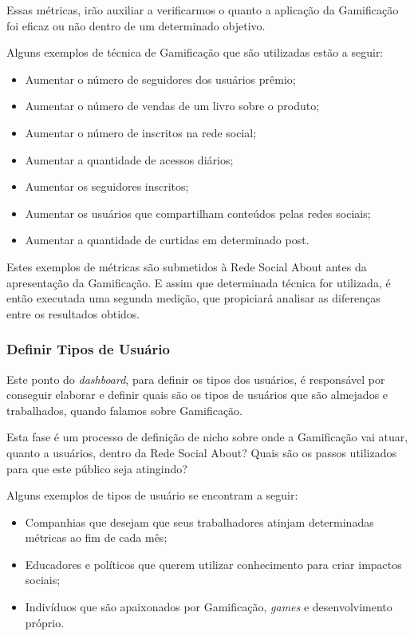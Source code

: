 Essas métricas, irão auxiliar a verificarmos o quanto a aplicação da Gamificação
 foi eficaz ou
não dentro de um determinado objetivo.

Alguns exemplos de técnica de Gamificação que são utilizadas estão a seguir:

\begin{itemize}
    \item Aumentar o número de seguidores dos usuários prêmio;
    \item Aumentar o número de vendas de um livro sobre o produto;
    \item Aumentar o número de inscritos na rede social;
    \item Aumentar a quantidade de acessos diários;
    \item Aumentar os seguidores inscritos;
    \item Aumentar os usuários que compartilham conteúdos pelas redes sociais;
    \item Aumentar a quantidade de curtidas em determinado post.
\end{itemize}

Estes exemplos de métricas são submetidos à Rede Social About antes da apresentação da
Gamificação. E assim que determinada técnica for utilizada, é então executada
 uma
segunda medição, que propiciará analisar as diferenças entre os resultados obtidos.

\subsubsection{Definir Tipos de Usuário}
\label{sub:define_user_types}
Este ponto do \textit{dashboard}, para definir os tipos dos usuários, é responsável por conseguir
elaborar e definir quais são os tipos de usuários que são almejados e trabalhados, quando
falamos sobre Gamificação.

Esta fase é um processo de definição de nicho sobre onde a Gamificação vai atuar, quanto a
usuários, dentro da Rede Social About? Quais são os passos utilizados para que este público
seja atingindo?

Alguns exemplos de tipos de usuário se encontram a seguir:

\begin{itemize}
    \item Companhias que desejam que seus trabalhadores atinjam determinadas métricas
        ao fim de cada mês;
    \item Educadores e políticos que querem utilizar conhecimento para criar impactos
        sociais;
    \item Indivíduos que são apaixonados por Gamificação, \textit{games} e desenvolvimento próprio.
\end{itemize}

